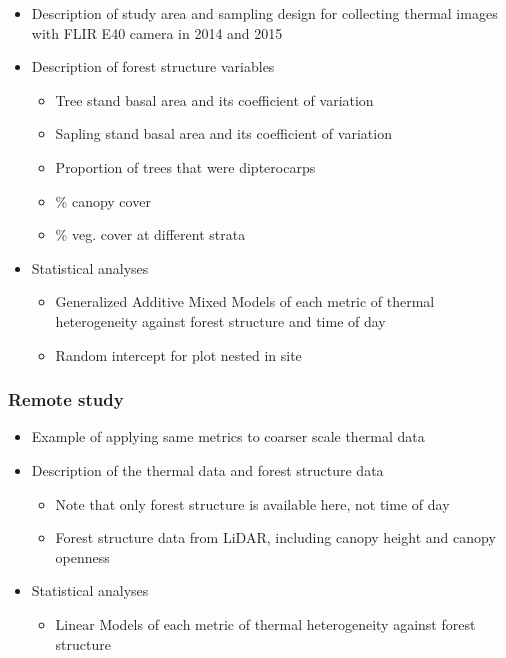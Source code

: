 \documentclass[12pt,a4paper,]{report}
\providecommand{\tightlist}{%
  \setlength{\itemsep}{0pt}\setlength{\parskip}{0pt}}
\theoremstyle{definition}
\theoremstyle{definition}
\theoremstyle{definition}
\theoremstyle{remark}
\begin{document}
\begin{itemize}
\tightlist
\item
  Description of study area and sampling design for collecting thermal
  images with FLIR E40 camera in 2014 and 2015
\item
  Description of forest structure variables

  \begin{itemize}
  \tightlist
  \item
    Tree stand basal area and its coefficient of variation
  \item
    Sapling stand basal area and its coefficient of variation
  \item
    Proportion of trees that were dipterocarps
  \item
    \% canopy cover
  \item
    \% veg. cover at different strata
  \end{itemize}
\item
  Statistical analyses

  \begin{itemize}
  \tightlist
  \item
    Generalized Additive Mixed Models of each metric of thermal
    heterogeneity against forest structure and time of day
  \item
    Random intercept for plot nested in site
  \end{itemize}
\end{itemize}

\subsubsection{Remote study}\label{remote-study}

\begin{itemize}
\tightlist
\item
  Example of applying same metrics to coarser scale thermal data
\item
  Description of the thermal data and forest structure data

  \begin{itemize}
  \tightlist
  \item
    Note that only forest structure is available here, not time of day
  \item
    Forest structure data from LiDAR, including canopy height and canopy
    openness
  \end{itemize}
\item
  Statistical analyses

  \begin{itemize}
  \tightlist
  \item
    Linear Models of each metric of thermal heterogeneity against forest
    structure
  \end{itemize}
\end{itemize}
\end{document}

